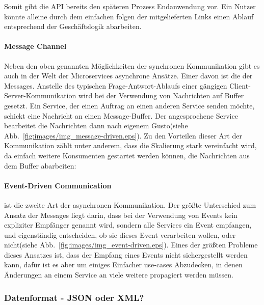\documentclass[12pt,a4paper,bibliography=totocnumbered,listof=totocnumbered]{scrartcl}
\begin{document}
Somit gibt die \ac{API} bereits den späteren Prozess Endanwendung vor. Ein Nutzer könnte alleine durch dem einfachen folgen der mitgelieferten Links einen Ablauf entsprechend der Geschäftslogik abarbeiten.


\paragraph{Message Channel}

Neben den oben genannten Möglichkeiten der synchronen Kommunikation gibt es auch in der Welt der Microservices asynchrone Ansätze. Einer davon ist die der Messages. Anstelle des typischen Frage-Antwort-Ablaufs einer gängigen Client-Server-Kommunikation wird bei der Verwendung von Nachrichten auf Buffer gesetzt. Ein Service, der einen Auftrag an einen anderen Service senden möchte, schickt eine Nachricht an einen Message-Buffer. Der angesprochene Service bearbeitet die Nachrichten dann nach eigenem Gusto(siehe Abb.~\ref{fig:images/img_message-driven.eps}). Zu den Vorteilen dieser Art der Kommunikation zählt unter anderem, dass die Skalierung stark vereinfacht wird, da einfach weitere Konsumenten gestartet werden können, die Nachrichten aus dem Buffer abarbeiten\cite{messagingwolff}:


\paragraph{Event-Driven Communication}

ist die zweite Art der asynchronen Kommunikation. Der größte Unterschied zum Ansatz der Messages liegt darin, dass bei der Verwendung von Events kein expliziter Empfänger genannt wird, sondern alle Services ein Event empfangen, und eigenständig entscheiden, ob sie dieses Event verarbeiten wollen, oder nicht(siehe Abb.~\ref{fig:images/img_event-driven.eps}).
Eines der größten Probleme dieses Ansatzes ist, dass der Empfang eines Events nicht sichergestellt werden kann, dafür ist es aber um einiges Einfacher use-cases Abzudecken, in denen Änderungen an einem Service an viele weitere propagiert werden müssen.\cite{messagingwolff}


\subsubsection{Datenformat - JSON oder XML?} 
\end{document}
